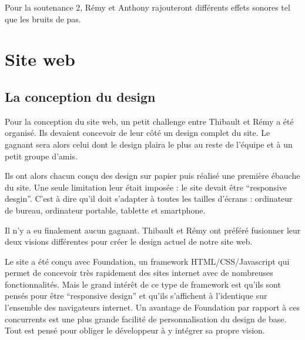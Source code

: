 \documentclass[11pt]{report}
\begin{document}
Pour la soutenance 2, Rémy et Anthony rajouteront différents effets sonores tel que les bruits de pas.

\newpage
\section{Site web}

\subsection{La conception du design}

Pour la conception du site web, un petit challenge entre Thibault et Rémy a été organisé. Ils devaient concevoir de leur côté un design complet du site. Le gagnant sera alors celui dont le design plaira le plus au reste de l'équipe et à un petit groupe d'amis.

Ils ont alors chacun conçu des design sur papier puis réalisé une première ébauche du site. Une seule limitation leur était imposée : le site devait être ``responsive desgin''. C'est à dire qu'il doit s'adapter à toutes les tailles d'écrans : ordinateur de bureau, ordinateur portable, tablette et smartphone.

Il n'y a eu finalement aucun gagnant. Thibault et Rémy ont préféré fusionner leur deux visions différentes pour créer le design actuel de notre site web.

Le site a été conçu avec Foundation, un framework HTML/CSS/Javascript qui permet de concevoir très rapidement des sites internet avec de nombreuses fonctionnalités. Mais le grand intérêt de ce type de framework est qu'ils sont pensés pour être ``responsive design'' et qu'ils s'affichent à l'identique sur l'ensemble des navigateurs internet. Un avantage de Foundation par rapport à ces concurrents est une plus grande facilité de personnalisation du design de base. Tout est pensé pour obliger le développeur à y intégrer sa propre vision.
\end{document}
